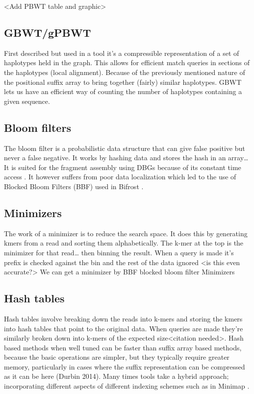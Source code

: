 \documentclass[11pt]{article}
\begin{document}
<Add PBWT table and graphic>

\subsection{GBWT/gPBWT}
\label{sec:org3f8856a}
First described \cite{novakGraphExtensionPositional2017} but used in a tool
\cite{sirenHaplotypeawareGraphIndexes2020} it’s a compressible representation of 
a set of haplotypes held in the graph. This allows for efficient match queries 
in sections of the haplotypes (local alignment). Because of the previously
mentioned nature of the positional suffix array to bring together (fairly) 
similar haplotypes. 
GBWT lets us have an efficient way of counting the number of haplotypes 
containing a given sequence.

\subsection{Bloom filters}
\label{sec:orgb74acef}
The bloom filter is a probabilistic data structure that can give false positive
but never a false negative.  It works by hashing data and stores the hash in an
array\ldots{}
It is suited for the fragment assembly using DBGs because of its constant time
access \cite{chikhiSpaceefficientExactBruijn2013}. It however suffers from poor
data localization  which led to the use of Blocked Bloom Filters (BBF) 
\cite{putzeCacheHashSpaceefficient2010} used in
Bifrost \cite{holleyBifrostHighlyParallel2019}.

\subsection{Minimizers}
\label{sec:orgf5af696}
The work of a minimizer is to reduce the search space. It does this by generating
kmers from a read and sorting them alphabetically. The k-mer at the top is the
minimizer for that read\ldots{} then binning the result. When a query is made it’s
prefix is checked against the bin and the rest of the data ignored
<is this even accurate?>
We can get a minimizer by BBF blocked bloom filter Minimizers
\cite{grabowskiDiskbasedCompressionData2015,robertsReducingStorageRequirements2004}

\subsection{Hash tables}
\label{sec:org3e51007}
Hash tables involve breaking down the reads into k-mers and storing the kmers
into hash tables that point to the original data. When queries are made they’re 
similarly broken down into k-mers of the expected size<citation needed>.
Hash based methods when well tuned can be faster than suffix array based 
methods, because the basic operations are simpler, but they typically require
greater memory, particularly in cases where the suffix representation can be
compressed as it can be here (Durbin 2014).
Many times tools take a hybrid approach; incorporating different aspects of
different indexing schemes such as in Minimap
\cite{liDesignConstructionReference2020}. 
\end{document}
